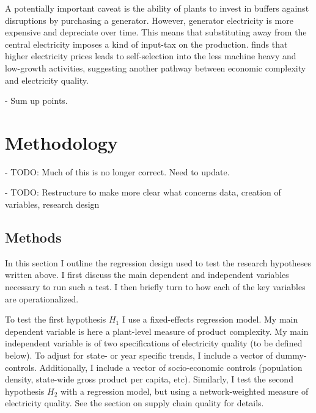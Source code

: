 \documentclass[11pt]{article}
\begin{document}
A potentially important caveat is the ability of plants to invest in buffers against disruptions by purchasing a generator. However, generator electricity is more expensive and depreciate over time. This means that substituting away from the central electricity imposes a kind of input-tax on the production. \cite{abeberese_electricity_2017} finds that higher electricity prices leads to self-selection into the less machine heavy and low-growth activities, suggesting another pathway between economic complexity and electricity quality.

- Sum up points. 


\newpage

\section{Methodology}%
\label{sub:methodology}

- TODO: Much of this is no longer correct. Need to update.

- TODO: Restructure to make more clear what concerns data, creation of variables, research design

\subsection{Methods}\label{sec:methods}

In this section I outline the regression design used to test the research hypotheses written above. I first discuss the main dependent and independent variables necessary to run such a test. I then briefly turn to how each of the key variables are operationalized.

To test the first hypothesis \(H_1\) I use a fixed-effects regression model. My main dependent variable is here a plant-level measure of product complexity. My main independent variable is of two specifications of electricity quality (to be defined below). To adjust for state- or year specific trends, I include a vector of dummy-controls. Additionally, I include a vector of socio-economic controls (population density, state-wide gross product per capita, etc). Similarly, I test the second hypothesis \(H_2\) with a regression model, but using a network-weighted measure of electricity quality. See the section on supply chain quality for details.
\end{document}
